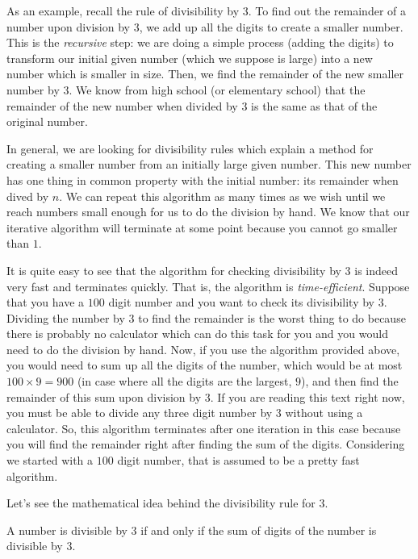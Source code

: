 As an example, recall the rule of divisibility by $3$. To find out the remainder of a number upon division by $3$, we add up all the digits to create a smaller number. This is the \textit{recursive} step: we are doing a simple process (adding the digits) to transform our initial given number (which we suppose is large) into a new number which is smaller in size. Then, we find the remainder of the new smaller number by $3$. We know from high school (or elementary school) that the remainder of the new number when divided by $3$ is the same as that of the original number.

In general, we are looking for divisibility rules which explain a method for creating a smaller number from an initially large given number. This new number has one thing in common property with the initial number: its remainder when dived by $n$. We can repeat this algorithm as many times as we wish until we reach numbers small enough for us to do the division by hand. We know that our iterative algorithm will terminate at some point because you cannot go smaller than $1$.

It is quite easy to see that the algorithm for checking divisibility by $3$ is indeed very fast and terminates quickly. That is, the algorithm is \textit{time-efficient}. Suppose that you have a $100$ digit number and you want to check its divisibility by $3$. Dividing the number by $3$ to find the remainder is the worst thing to do because there is probably no calculator which can do this task for you and you would need to do the division by hand. Now, if you use the algorithm provided above, you would need to sum up all the digits of the number, which would be at most $100 \times 9 = 900$ (in case where all the digits are the largest, $9$), and then find the remainder of this sum upon division by $3$. If you are reading this text right now, you must be able to divide any three digit number by $3$ without using a calculator. So, this algorithm terminates after one iteration in this case because you will find the remainder right after finding the sum of the digits. Considering we started with a $100$ digit number, that is assumed to be a pretty fast algorithm.

Let's see the mathematical idea behind the divisibility rule for $3$.


\begin{proposition}[Divisibility by $3$]
	A number is divisible by $3$ if and only if the sum of digits of the number is divisible by $3$.
\end{proposition}

